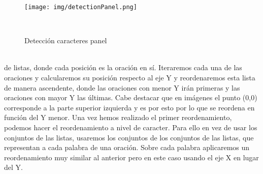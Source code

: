 \documentclass[a4paper, 12pt]{article}
\begin{document}
\begin{figure}[h]
	\centering
	\texttt{[image: img/detectionPanel.png]}
 	\caption{Detección caracteres panel}\
	\label{fig:imagenDetectada}
\end{figure}
\\de listas, donde cada posición es la oración en sí. Iteraremos cada una de las oraciones y calcularemos su posición respecto al eje Y y reordenaremos esta lista de manera ascendente, donde las oraciones con menor Y irán primeras y las oraciones con mayor Y las últimas. Cabe destacar que en imágenes el punto (0,0) corresponde a la parte superior izquierda y es por esto por lo que se reordena en función del Y menor. Una vez hemos realizado el primer reordenamiento, podemos hacer el reordenamiento a nivel de caracter. Para ello en vez de usar los conjuntos de las listas, usaremos los conjuntos de los conjuntos de las listas, que representan a cada palabra de una oración. Sobre cada palabra aplicaremos un reordenamiento muy similar al anterior pero en este caso usando el eje X en lugar del Y. 
\end{document}
